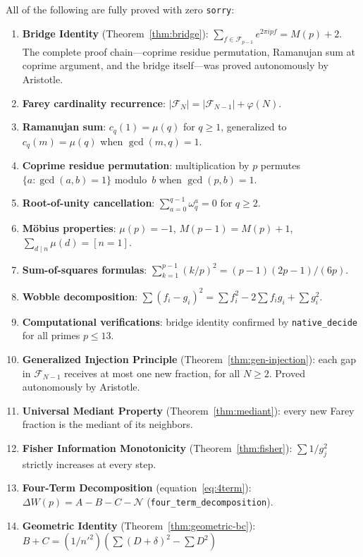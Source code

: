 \documentclass[11pt]{article}
\theoremstyle{definition}
\newcommand{\F}{\mathcal{F}}
\begin{document}
All of the following are fully proved with zero \texttt{sorry}:
\begin{enumerate}
  \item \textbf{Bridge Identity} (Theorem~\ref{thm:bridge}):
    $\sum_{f \in \F_{p-1}} e^{2\pi ipf} = M(p) + 2$.
    The complete proof chain---coprime residue permutation,
    Ramanujan sum at coprime argument, and the bridge
    itself---was proved autonomously by Aristotle.
  \item \textbf{Farey cardinality recurrence}:
    $|\F_N| = |\F_{N-1}| + \varphi(N)$.
  \item \textbf{Ramanujan sum}: $c_q(1) = \mu(q)$ for $q \ge 1$,
    generalized to $c_q(m) = \mu(q)$ when $\gcd(m,q) = 1$.
  \item \textbf{Coprime residue permutation}:
    multiplication by $p$ permutes $\{a : \gcd(a,b) = 1\}$
    modulo~$b$ when $\gcd(p,b) = 1$.
  \item \textbf{Root-of-unity cancellation}:
    $\sum_{a=0}^{q-1}\omega_q^a = 0$ for $q \ge 2$.
  \item \textbf{M\"obius properties}: $\mu(p) = -1$,
    $M(p-1) = M(p) + 1$, $\sum_{d \mid n}\mu(d) = [n=1]$.
  \item \textbf{Sum-of-squares formulas}:
    $\sum_{k=1}^{p-1}(k/p)^2 = (p-1)(2p-1)/(6p)$.
  \item \textbf{Wobble decomposition}:
    $\sum (f_i - g_i)^2 = \sum f_i^2 - 2\sum f_i g_i + \sum g_i^2$.
  \item \textbf{Computational verifications}:
    bridge identity confirmed by \texttt{native\_decide} for
    all primes $p \le 13$.
  \item \textbf{Generalized Injection Principle}
    (Theorem~\ref{thm:gen-injection}):
    each gap in $\F_{N-1}$ receives at most one new fraction,
    for all $N \ge 2$.  Proved autonomously by Aristotle.
  \item \textbf{Universal Mediant Property}
    (Theorem~\ref{thm:mediant}):
    every new Farey fraction is the mediant of its neighbors.
  \item \textbf{Fisher Information Monotonicity}
    (Theorem~\ref{thm:fisher}):
    $\sum 1/g_j^2$ strictly increases at every step.
  \item \textbf{Four-Term Decomposition}
    (equation~\eqref{eq:4term}):
    $\Delta W(p) = A - B - C - \mathcal{N}$
    (\texttt{four\_term\_decomposition}).
  \item \textbf{Geometric Identity}
    (Theorem~\ref{thm:geometric-bc}):
    $B + C = (1/{n'}^2)(\sum(D+\delta)^2 - \sum D^2)$

\end{enumerate}
\end{document}
